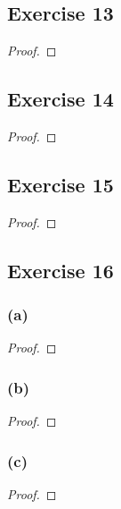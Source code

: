 \documentclass[14pt]{extarticle}
\begin{document}
\subsection{Exercise 13}

\begin{proof}

\end{proof}

\subsection{Exercise 14}

\begin{proof}

\end{proof}

\subsection{Exercise 15}

\begin{proof}

\end{proof}

\subsection{Exercise 16}

\subsubsection{(a)}

\begin{proof}

\end{proof}

\subsubsection{(b)}

\begin{proof}

\end{proof}

\subsubsection{(c)}

\begin{proof}

\end{proof}
\end{document}
